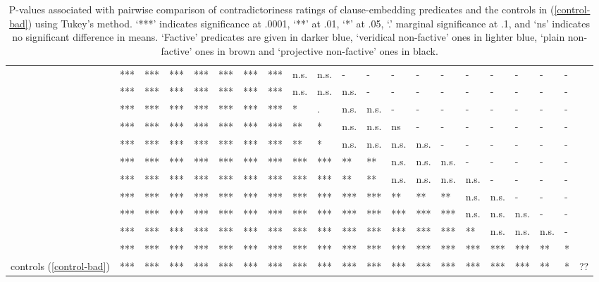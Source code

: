 \documentclass[11pt,fleqn]{article}
\newcommand{\6}{\mbox{$[\hspace*{-.6mm}[$}}
\newcommand{\9}{\mbox{$]\hspace*{-.6mm}]$}}
\begin{document}
{\begin{table}[h!]
\begin{tabular}{l l l l l l l l l l l l l l l l l l l l l}
\color{black}{\em confess}\color{black}		& *** & *** & *** & *** & *** & *** & *** & n.s. & n.s. & - & - & - & - & - & - & - & - & - & - \\
\color{black}{\em acknowledge}\color{black}	& *** & *** & *** & *** & *** & *** & *** & n.s. & n.s. & n.s. & - & - & - & - & - & - & - & - & - \\
\color{black}{\em admit}\color{black}			& *** & *** & *** & *** & *** & *** & *** & * & . & n.s. & n.s. & - & - & - & - & - & - & - & - \\
\color{black}{\em establish}\color{black}		& *** & *** & *** & *** & *** & *** & *** & ** & * & n.s. & n.s. &  ns & - & - & - & - & - & - & - \\
\color{airforceblue}{\em demonstrate}\color{black}	& *** & *** & *** & *** & *** & *** & *** & ** & * & n.s. & n.s. & n.s. & n.s. & - & - & - & - & - & - \\
\color{black}{\em confirm}\color{black}		& *** & *** & *** & *** & *** & *** & *** & *** & *** & ** & ** & n.s. & n.s. & n.s. & - & - & - & - & - \\
\color{blue}{\em discover}\color{black}		& *** & *** & *** & *** & *** & *** & *** & *** & *** & ** & ** & n.s. & n.s. & n.s. & n.s. & - & - & - & - \\
\color{blue}{\em see}\color{black}			& *** & *** & *** & *** & *** & *** & *** & *** & *** & *** & *** & ** & ** & ** & n.s. & n.s. & - & - & - \\
\color{blue}{\em know}\color{black}			& *** & *** & *** & *** & *** & *** & *** & *** & *** & *** & *** & *** & *** & *** & n.s. & n.s. & n.s. & - & - \\
\color{black}{\em prove}\color{black}			& *** & *** & *** & *** & *** & *** & *** & *** & *** & *** & *** & *** & *** & *** & ** & n.s. & n.s. & n.s. & -  \\
\color{airforceblue}{\em be right}\color{black}		& *** & *** & *** & *** & *** & *** & *** & *** & ***  & ***  & *** & *** & *** & *** & *** & *** & *** & ** & *  \\
\color{black}controls (\ref{control-bad})\color{black}		& *** & *** & *** & *** & *** & *** & *** & *** & ***  & ***  & *** & *** & *** & *** & *** & *** & *** & ** & *  & ?? \\

\bottomrule
\end{tabular}
\caption{P-values associated with pairwise comparison of contradictoriness ratings of clause-embedding predicates and the controls in (\ref{control-bad}) using Tukey's method. `***' indicates significance at .0001, `**' at .01, `*' at .05, `.' marginal significance at .1, and `ns' indicates no significant difference in means. `Factive' predicates are given in darker blue, `veridical non-factive' ones in lighter blue, `plain non-factive' ones in brown and `projective non-factive' ones in black.}\label{t-pairwise}
\end{table}

}
\end{document}

